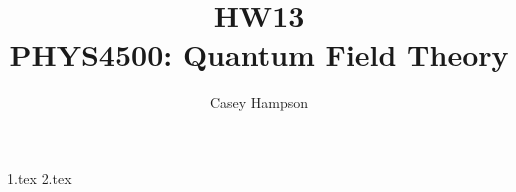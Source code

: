 \documentclass[titlepage]{article}
\title{HW13 \\[5pt] PHYS4500: Quantum Field Theory}
\author{Casey Hampson}
\begin{document}
    \maketitle
    \pagebreak

    {1.tex}
    {2.tex}
\end{document}
